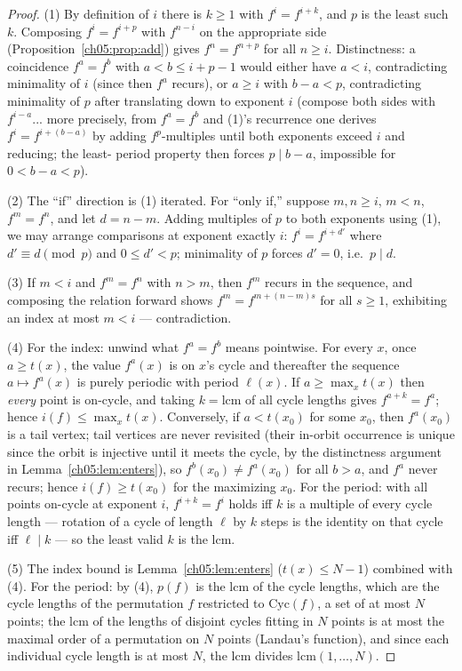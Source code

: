 \begin{proof}
(1) By definition of $i$ there is $k \ge 1$ with $f^{i} = f^{i+k}$, and $p$
is the least such $k$. Composing $f^{i} = f^{i+p}$ with $f^{n-i}$ on the
appropriate side (Proposition~\ref{ch05:prop:add}) gives $f^{n} = f^{n+p}$
for all $n \ge i$. Distinctness: a coincidence $f^{a} = f^{b}$ with
$a < b \le i + p - 1$ would either have $a < i$, contradicting minimality
of $i$ (since then $f^{a}$ recurs), or $a \ge i$ with $b - a < p$,
contradicting minimality of $p$ after translating down to exponent $i$
(compose both sides with $f^{i - a}$... more precisely, from $f^{a} =
f^{b}$ and (1)'s recurrence one derives $f^{i} = f^{i + (b-a)}$ by adding
$f^{p}$-multiples until both exponents exceed $i$ and reducing; the least-
period property then forces $p \mid b - a$, impossible for
$0 < b - a < p$).

(2) The ``if'' direction is (1) iterated. For ``only if,'' suppose
$m, n \ge i$, $m < n$, $f^{m} = f^{n}$, and let $d = n - m$. Adding
multiples of $p$ to both exponents using (1), we may arrange comparisons at
exponent exactly $i$: $f^{i} = f^{i + d'}$ where $d' \equiv d \pmod p$ and
$0 \le d' < p$; minimality of $p$ forces $d' = 0$, i.e.\ $p \mid d$.

(3) If $m < i$ and $f^{m} = f^{n}$ with $n > m$, then $f^{m}$ recurs in the
sequence, and composing the relation forward shows $f^{m} = f^{m + (n-m)s}$
for all $s \ge 1$, exhibiting an index at most $m < i$ --- contradiction.

(4) For the index: unwind what $f^{a} = f^{b}$ means pointwise. For every
$x$, once $a \ge t(x)$, the value $f^{a}(x)$ is on $x$'s cycle and
thereafter the sequence $a \mapsto f^{a}(x)$ is purely periodic with period
$\ell(x)$. If $a \ge \max_x t(x)$ then \emph{every} point is on-cycle, and
taking $k = \mathrm{lcm}$ of all cycle lengths gives $f^{a+k} = f^{a}$;
hence $i(f) \le \max_x t(x)$. Conversely, if $a < t(x_0)$ for some $x_0$,
then $f^{a}(x_0)$ is a tail vertex; tail vertices are never revisited
(their in-orbit occurrence is unique since the orbit is injective until it
meets the cycle, by the distinctness argument in
Lemma~\ref{ch05:lem:enters}), so $f^{b}(x_0) \ne f^{a}(x_0)$ for all
$b > a$, and $f^{a}$ never recurs; hence $i(f) \ge t(x_0)$ for the
maximizing $x_0$. For the period: with all points on-cycle at exponent
$i$, $f^{i+k} = f^{i}$ holds iff $k$ is a multiple of every cycle length
--- rotation of a cycle of length $\ell$ by $k$ steps is the identity on
that cycle iff $\ell \mid k$ --- so the least valid $k$ is the lcm.

(5) The index bound is Lemma~\ref{ch05:lem:enters} ($t(x) \le N - 1$)
combined with (4). For the period: by (4), $p(f)$ is the lcm of the cycle
lengths, which are the cycle lengths of the permutation $f$ restricted to
$\mathrm{Cyc}(f)$, a set of at most $N$ points; the lcm of the lengths of
disjoint cycles fitting in $N$ points is at most the maximal order of a
permutation on $N$ points (Landau's function), and since each individual
cycle length is at most $N$, the lcm divides $\mathrm{lcm}(1, \dots, N)$.
\end{proof}

